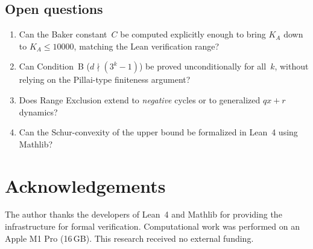 \documentclass[11pt, a4paper]{amsart}
\theoremstyle{plain}
\theoremstyle{definition}
\theoremstyle{remark}
\begin{document}
\subsection{Open questions}\label{ssec:open}

\begin{enumerate}
  \item Can the Baker constant~$C$ be computed explicitly enough
        to bring $K_A$ down to $K_A \leq 10000$, matching the
        Lean verification range?
  \item Can Condition~B ($d \nmid (3^k-1)$) be proved unconditionally
        for all~$k$, without relying on the Pillai-type finiteness
        argument?
  \item Does Range Exclusion extend to \emph{negative} cycles or
        to generalized $qx{+}r$ dynamics?
  \item Can the Schur-convexity of the upper bound be formalized
        in Lean~4 using Mathlib?
\end{enumerate}

\section*{Acknowledgements}

The author thanks the developers of Lean~4 and Mathlib for
providing the infrastructure for formal verification.
Computational work was performed on an Apple M1 Pro (16\,GB).
This research received no external funding.
\end{document}
